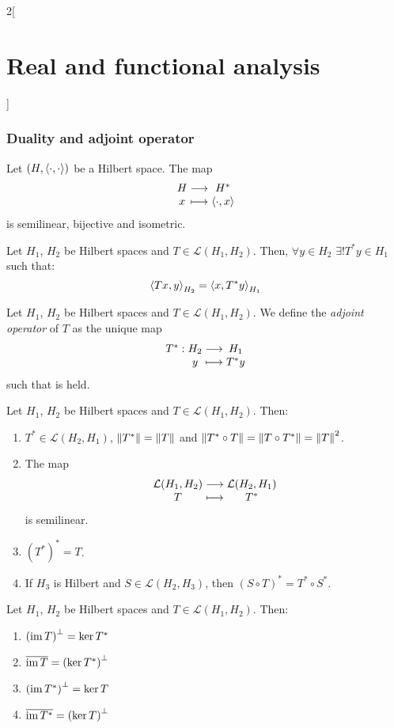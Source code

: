 \documentclass[../../../main_math.tex]{subfiles}
\begin{document}
\begin{multicols}{2}[\section{Real and functional analysis}]
  \subsubsection{Duality and adjoint operator}
  \begin{theorem}
    Let $(H,{\left\langle\cdot,\cdot\right\rangle})$ be a Hilbert space. The map $$\function{}{H}{H^*}{x}{\dotp{\cdot}{x}}$$ is semilinear, bijective and isometric.
  \end{theorem}
  \begin{corollary}
    Let $H_1$, $H_2$ be Hilbert spaces and $T\in\mathcal{L}(H_1,H_2)$. Then, $\forall y\in H_2$ $\exists! T^*y\in H_1$ such that:
    \begin{equation}\label{RFA:adjoint}
      {\left\langle Tx,y\right\rangle}_{H_2}={\left\langle x,T^*y\right\rangle}_{H_1}
    \end{equation}
  \end{corollary}
  \begin{definition}
    Let $H_1$, $H_2$ be Hilbert spaces and $T\in\mathcal{L}(H_1,H_2)$. We define the \emph{adjoint operator} of $T$ as the unique map $$\function{T^*}{H_2}{H_1}{y}{T ^*y}$$ such that  is held.
  \end{definition}
  \begin{proposition}
    Let $H_1$, $H_2$ be Hilbert spaces and $T\in\mathcal{L}(H_1,H_2)$. Then:
    \begin{enumerate}
      \item $T^*\in\mathcal{L}(H_2,H_1)$, $\left\|T^*\right\|=\left\|T\right\|$ and $\left\|T^*\circ T\right\|=\left\|T\circ T^*\right\|=\left\|T\right\|^2$.
      \item The map $$\function{}{\mathcal{L}(H_1,H_2)}{\mathcal{L}(H_2,H_1)}{T}{T^*}$$ is semilinear.
      \item ${(T^*)}^* = T$.
      \item If $H_3$ is Hilbert and $S\in\mathcal{L}(H_2,H_3)$, then ${(S\circ T)}^*=T^*\circ S^*$.
    \end{enumerate}
  \end{proposition}
  \begin{proposition}
    Let $H_1$, $H_2$ be Hilbert spaces and $T\in\mathcal{L}(H_1,H_2)$. Then:
    \begin{enumerate}
      \item ${(\operatorname{im} T)}^\perp =\ker T^*$
      \item $\overline{\operatorname{im} T} = {(\ker T^*)}^\perp$
      \item ${(\operatorname{im} T^*)}^\perp =\ker T$
      \item $\overline{\operatorname{im} T^*} = {(\ker T)}^\perp$

\end{enumerate}
\end{proposition}
\end{multicols}
\end{document}
